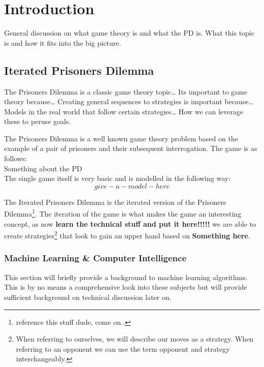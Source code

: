 
\chapter{Introduction}\label{ch:intro}

General discussion on what game theory is and what the PD is.
What this topic is and how it fits into the big picture.\\

\section{Iterated Prisoners Dilemma}\label{sec:iteratedPrisonersDilemma}
The Prisoners Dilemma is a classic game theory topic\ldots
Its important to game theory because\ldots
Creating general sequences to strategies is important because\ldots
Models in the real world that follow certain strategies\ldots
How we can leverage these to peruse goals.

The Prisoners Dilemma is a well known game theory problem based on the example of a pair of prisoners and their subsequent interrogation.
The game is as follows:\\

Something about the PD \\

The single game itself is very basic and is modelled in the following way: \\

\[give-a-model-here\]

The Iterated Prisoners Dilemma is the iterated version of the Prisoners Dilemma\footnote{reference this stuff dude, come on..}.
The iteration of the game is what makes the game an interesting concept, as now \textbf{learn the technical stuff and
put it here!!!!!} we are able to create strategies\footnote{When referring to ourselves, we will describe our moves as a strategy.
When referring to an opponent we can use the term opponent and strategy interchangeably.} that look to gain an upper hand based on \textbf{Something here}.

\subsection{Machine Learning \& Computer Intelligence}\label{subsec:machineLearningAndcomputerIntelligence}
This section will briefly provide a background to machine learning algorithms.
This is by no means a comprehensive look into these subjects but will provide sufficient background on technical discussion later on.\\

